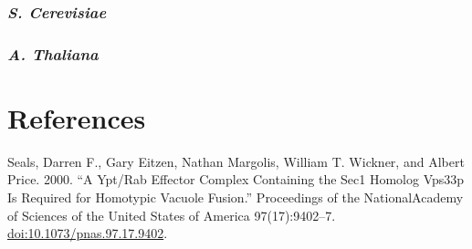 \documentclass[12pt,twoside]{reedthesis}
\begin{document}
\subsection*{\texorpdfstring{\emph{S. Cerevisiae}}{S. Cerevisiae}}\label{s.-cerevisiae}

\subsection*{\texorpdfstring{\emph{A. Thaliana}}{A. Thaliana}}\label{a.-thaliana}

\backmatter

\chapter*{References}\label{references}


\noindent 

\setlength{\parindent}{-0.20in}

Seals, Darren F., Gary Eitzen, Nathan Margolis, William T. Wickner, and Albert Price. 2000. ``A Ypt/Rab Effector Complex Containing the Sec1 Homolog Vps33p Is Required for Homotypic Vacuole Fusion.'' Proceedings of the NationalAcademy of Sciences of the United States of America 97(17):9402--7. \url{doi:10.1073/pnas.97.17.9402}.
\end{document}
